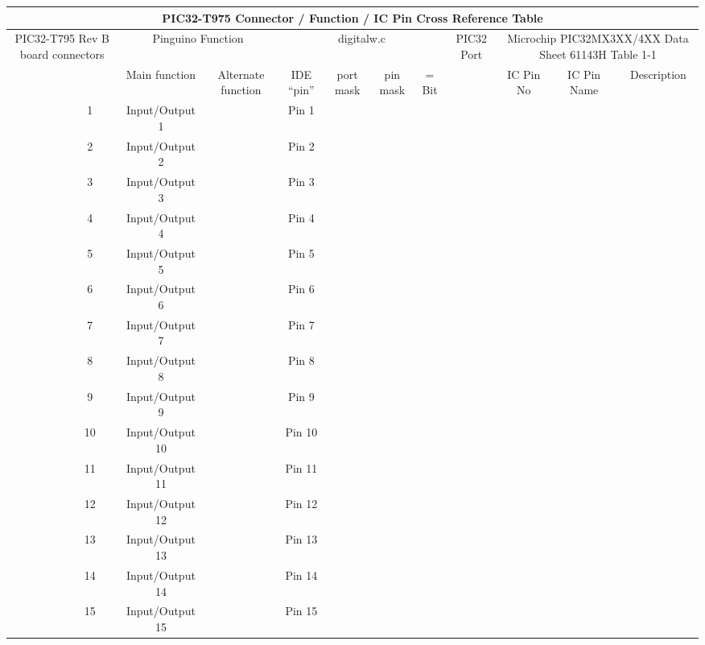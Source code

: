 \documentclass[10pt,a4paper,landscape]{article}
\author{Gergely Imreh}
\begin{document}
\begin{table}[t]
\centering
\resizebox{25cm}{!} {
\begin{tabular}{|ccc|c|c|c|c|c|c|c|c|c|c|}
\hline
\multicolumn{13}{|c|}{\bf PIC32-T975 Connector / Function / IC Pin Cross Reference Table} \\
\hline
\multicolumn{3}{|c|}{\multirow{2}{*}{PIC32-T795
Rev B board connectors}} & \multicolumn{2}{|c|}{Pinguino Function
} & \multicolumn{4}{|c|}{digitalw.c} & \multirow{2}{*}{PIC32 Port} & \multicolumn{3}{|c|}{Microchip PIC32MX3XX/4XX Data Sheet 61143H Table 1-1
} \\
\cline{4-9} \cline{11-13}
 &  &  & Main function & Alternate function & IDE ``pin'' & port mask & pin mask & = Bit & & IC Pin No & IC Pin Name & Description \\
\hline
\hline
 &  & \multicolumn{1}{|c|}{1} & Input/Output 1 & & Pin 1 & & & & & & & \\
\hline
 &  & \multicolumn{1}{|c|}{2} & Input/Output 2 & & Pin 2 & & & & & & & \\
\hline
 &  & \multicolumn{1}{|c|}{3} & Input/Output 3 & & Pin 3 & & & & & & & \\
\hline
 &  & \multicolumn{1}{|c|}{4} & Input/Output 4 & & Pin 4 & & & & & & & \\
\hline
 &  & \multicolumn{1}{|c|}{5} & Input/Output 5 & & Pin 5 & & & & & & & \\
\hline
 &  & \multicolumn{1}{|c|}{6} & Input/Output 6 & & Pin 6 & & & & & & & \\
\hline
 &  & \multicolumn{1}{|c|}{7} & Input/Output 7 & & Pin 7 & & & & & & & \\
\hline
 &  & \multicolumn{1}{|c|}{8} & Input/Output 8 & & Pin 8 & & & & & & & \\
\hline
 &  & \multicolumn{1}{|c|}{9} & Input/Output 9 & & Pin 9 & & & & & & & \\
\hline
 &  & \multicolumn{1}{|c|}{10} & Input/Output 10 & & Pin 10 & & & & & & & \\
\hline
 &  & \multicolumn{1}{|c|}{11} & Input/Output 11 & & Pin 11 & & & & & & & \\
\hline
 &  & \multicolumn{1}{|c|}{12} & Input/Output 12 & & Pin 12 & & & & & & & \\
\hline
 &  & \multicolumn{1}{|c|}{13} & Input/Output 13 & & Pin 13 & & & & & & & \\
\hline
 &  & \multicolumn{1}{|c|}{14} & Input/Output 14 & & Pin 14 & & & & & & & \\
\hline
 &  & \multicolumn{1}{|c|}{15} & Input/Output 15 & & Pin 15 & & & & & & & \\

\end{tabular}}
\end{table}
\end{document}
